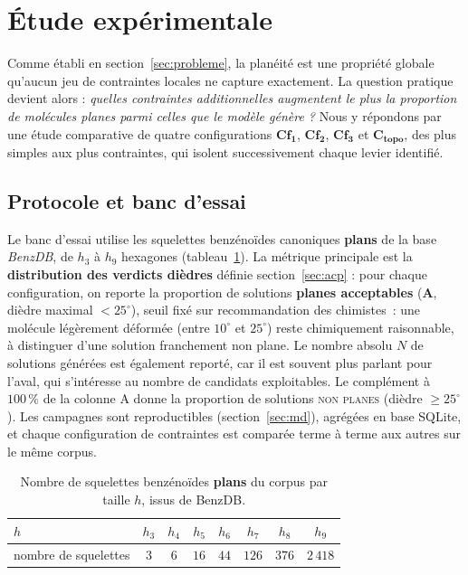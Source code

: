 \documentclass[11pt,a4paper]{article}
\begin{document}


\section{Étude expérimentale}
\label{sec:xp}

Comme établi en section~\ref{sec:probleme}, la planéité est une propriété
globale qu'aucun jeu de contraintes locales ne capture exactement. La question
pratique devient alors : \emph{quelles contraintes additionnelles augmentent le
plus la proportion de molécules planes parmi celles que le modèle génère ?} Nous
y répondons par une étude comparative de quatre configurations $\mathbf{Cf_1}$,
$\mathbf{Cf_2}$, $\mathbf{Cf_3}$ et $\mathbf{C_{\text{topo}}}$, des plus simples
aux plus contraintes, qui isolent successivement chaque levier identifié.

\subsection{Protocole et banc d'essai}

Le banc d'essai utilise les squelettes benzénoïdes canoniques \textbf{plans}
de la base \emph{BenzDB}, de $h_3$ à $h_9$ hexagones
(tableau~\ref{tab:corpus}). La métrique principale est la \textbf{distribution
des verdicts dièdres} définie section~\ref{sec:acp} : pour chaque
configuration, on reporte la proportion de solutions \textbf{planes
acceptables} (\textbf{A}, dièdre maximal $< 25^\circ$), seuil fixé sur
recommandation des chimistes~: une molécule légèrement déformée (entre
$10^\circ$ et $25^\circ$) reste chimiquement raisonnable, à distinguer
d'une solution franchement non plane. Le nombre absolu $N$ de solutions
générées est également reporté, car il est souvent plus parlant pour
l'aval, qui s'intéresse au nombre de candidats exploitables. Le
complément à $100\,\%$ de la colonne A donne la proportion de solutions
\textsc{non planes} (dièdre $\ge 25^\circ$). Les campagnes sont
reproductibles (section~\ref{sec:md}), agrégées en base SQLite, et
chaque configuration de contraintes est comparée terme à terme aux
autres sur le même corpus.

\begin{table}[h]
\centering
\begin{tabular}{lccccccc}
\toprule
$h$ & $h_3$ & $h_4$ & $h_5$ & $h_6$ & $h_7$ & $h_8$ & $h_9$ \\
\midrule
nombre de squelettes & $3$ & $6$ & $16$ & $44$ & $126$ & $376$ & $2\,418$ \\
\bottomrule
\end{tabular}
\caption{Nombre de squelettes benzénoïdes \textbf{plans} du corpus par taille $h$, issus de BenzDB.}
\label{tab:corpus}
\end{table}
\end{document}
